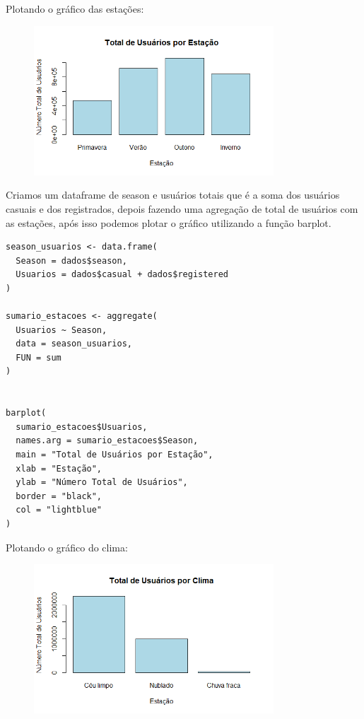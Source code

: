 \documentclass[a4paper,11pt]{article}
\begin{document}
\begin{description}[leftmargin=*]
\begin{lstlisting}
\end{lstlisting}

Plotando o gráfico das estações:

\begin{figure}[H] 
    \centering 
    \includegraphics[width=0.8\textwidth]{Imagens/Graficos/Distribuição estação.png} 
\end{figure}

Criamos um dataframe de season e usuários totais que é a soma dos usuários casuais e dos registrados, depois fazendo uma agregação de total de usuários com as estações, após isso podemos plotar o gráfico utilizando a função barplot.

\begin{lstlisting}
season_usuarios <- data.frame(
  Season = dados$season,
  Usuarios = dados$casual + dados$registered
)

sumario_estacoes <- aggregate(
  Usuarios ~ Season,             
  data = season_usuarios,
  FUN = sum
)


barplot(
  sumario_estacoes$Usuarios,
  names.arg = sumario_estacoes$Season, 
  main = "Total de Usuários por Estação",
  xlab = "Estação",
  ylab = "Número Total de Usuários",
  border = "black",
  col = "lightblue"
)

\end{lstlisting}

Plotando o gráfico do clima:

\begin{figure}[H] 
    \centering 
    \includegraphics[width=0.8\textwidth]{Imagens/Graficos/Distribuição clima.png} 
\end{figure}


\end{description}
\end{document}
